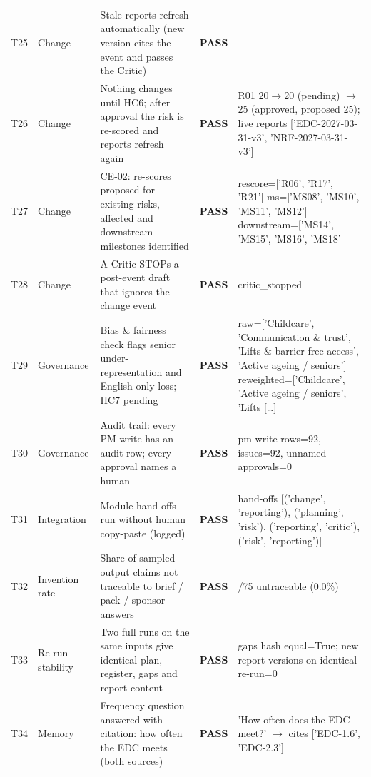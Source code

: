 {\begin{longtable}{@{}>{\raggedright\arraybackslash}p{0.75cm}>{\raggedright\arraybackslash}p{1.9cm}>{\raggedright\arraybackslash}p{4.2cm}>{\raggedright\arraybackslash}p{1.0cm}>{\raggedright\arraybackslash}p{6.9cm}@{}}
T25 & Change & Stale reports refresh automatically (new version cites the event and passes the Critic) & \textbf{PASS} & {} \\
T26 & Change & Nothing changes until HC6; after approval the risk is re-scored and reports refresh again & \textbf{PASS} & {\ttfamily R01 20$\rightarrow$20 (pending) $\rightarrow$25 (approved,\allowbreak{} proposed 25); live reports ['EDC-2027-03-31-v3',\allowbreak{} 'NRF-2027-03-31-v3']} \\
T27 & Change & CE-02: re-scores proposed for existing risks, affected and downstream milestones identified & \textbf{PASS} & {\ttfamily rescore=\allowbreak{}['R06',\allowbreak{} 'R17',\allowbreak{} 'R21'] ms=\allowbreak{}['MS08',\allowbreak{} 'MS10',\allowbreak{} 'MS11',\allowbreak{} 'MS12'] downstream=\allowbreak{}['MS14',\allowbreak{} 'MS15',\allowbreak{} 'MS16',\allowbreak{} 'MS18']} \\
T28 & Change & A Critic STOPs a post-event draft that ignores the change event & \textbf{PASS} & {\ttfamily critic\_stopped} \\
T29 & Governance & Bias \& fairness check flags senior under-representation and English-only loss; HC7 pending & \textbf{PASS} & {\ttfamily raw=\allowbreak{}['Childcare',\allowbreak{} 'Communication \& trust',\allowbreak{} 'Lifts \& barrier-free access',\allowbreak{} 'Active ageing /\allowbreak{} seniors'] reweighted=\allowbreak{}['Childcare',\allowbreak{} 'Active ageing /\allowbreak{} seniors',\allowbreak{} 'Lifts } [\ldots] \\
T30 & Governance & Audit trail: every PM write has an audit row; every approval names a human & \textbf{PASS} & {\ttfamily pm write rows=\allowbreak{}92,\allowbreak{} issues=\allowbreak{}92,\allowbreak{} unnamed approvals=\allowbreak{}0} \\
T31 & Integration & Module hand-offs run without human copy-paste (logged) & \textbf{PASS} & {\ttfamily hand-offs [('change',\allowbreak{} 'reporting'),\allowbreak{} ('planning',\allowbreak{} 'risk'),\allowbreak{} ('reporting',\allowbreak{} 'critic'),\allowbreak{} ('risk',\allowbreak{} 'reporting')]} \\
T32 & Invention rate & Share of sampled output claims not traceable to brief / pack / sponsor answers & \textbf{PASS} & {\ttfamily 0/\allowbreak{}75 untraceable (0.0\%)} \\
T33 & Re-run stability & Two full runs on the same inputs give identical plan, register, gaps and report content & \textbf{PASS} & {\ttfamily gaps hash equal=\allowbreak{}True; new report versions on identical re-run=\allowbreak{}0} \\
T34 & Memory & Frequency question answered with citation: how often the EDC meets (both sources) & \textbf{PASS} & {\ttfamily 'How often does the EDC meet?' $\rightarrow$ cites ['EDC-1.6',\allowbreak{} 'EDC-2.3']} \\
\end{longtable}
}
